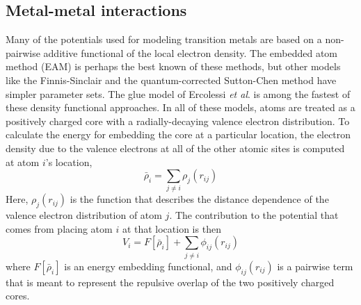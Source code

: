 \documentclass[journal = jpccck, manuscript = article]{achemso}
\begin{document}
\subsection{Metal-metal interactions}
Many of the potentials used for modeling transition metals are based
on a non-pairwise additive functional of the local electron
density. The embedded atom method (EAM) is perhaps the best known of
these
methods,\cite{Daw84,Foiles86,Johnson89,Daw89,Plimpton93,Voter95a,Lu97,Alemany98}
but other models like the Finnis-Sinclair\cite{Finnis84,Chen90} and
the quantum-corrected Sutton-Chen method\cite{QSC,Qi99} have simpler
parameter sets. The glue model of Ercolessi {\it et
  al}.\cite{Ercolessi88} is among the fastest of these density
functional approaches. In all of these models, atoms are treated as a
positively charged core with a radially-decaying valence electron
distribution. To calculate the energy for embedding the core at a
particular location, the electron density due to the valence electrons
at all of the other atomic sites is computed at atom $i$'s location,
\begin{equation*}
\bar{\rho}_i = \sum_{j\neq i} \rho_j(r_{ij})
\end{equation*}
Here, $\rho_j(r_{ij})$ is the function that describes the distance
dependence of the valence electron distribution of atom $j$. The
contribution to the potential that comes from placing atom $i$ at that
location is then
\begin{equation*}
V_i =  F[ \bar{\rho}_i ]  + \sum_{j \neq i} \phi_{ij}(r_{ij})
\end{equation*}
where $F[ \bar{\rho}_i ]$ is an energy embedding functional, and
$\phi_{ij}(r_{ij})$ is a pairwise term that is meant to represent the
repulsive overlap of the two positively charged cores.  

\end{document}
